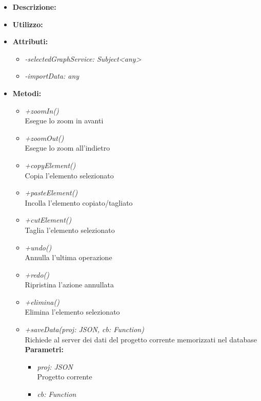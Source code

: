 \begin{itemize}
	\item \textbf{Descrizione:}\\
	
	\item \textbf{Utilizzo:}\\
	
	\item \textbf{Attributi:}
		\begin{itemize}
			\item \emph{-selectedGraphService: Subject<any>}\\
			
			\item \emph{-importData: any}\\
			
		\end{itemize}
	\item \textbf{Metodi:}
		\begin{itemize}
			\item \emph{+zoomIn()}\\
    		Esegue lo zoom in avanti
    		\item \emph{+zoomOut()}\\
    		Esegue lo zoom all'indietro
    		\item \emph{+copyElement()}\\
    		Copia l'elemento selezionato
    		\item \emph{+pasteElement()}\\
    		Incolla l'elemento copiato/tagliato
    		\item \emph{+cutElement()}\\
    		Taglia l'elemento selezionato
    		\item \emph{+undo()}\\
    		Annulla l'ultima operazione
    		\item \emph{+redo()}\\
    		Ripristina l'azione annullata
    		\item \emph{+elimina()}\\
    		Elimina l'elemento selezionato
    		\item \emph{+saveData(proj: JSON, cb: Function)}\\
    		Richiede al server dei dati del progetto corrente memorizzati nel database\\
    		\textbf{Parametri:}
    		\begin{itemize}
    			\item \emph{proj: JSON}\\
    			Progetto corrente
    			\item \emph{cb: Function}\\
    			

\end{itemize}
\end{itemize}
\end{itemize}
